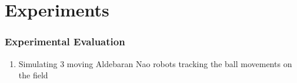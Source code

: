 \section{Experiments}

\begin{frame}
	\frametitle{Experimental Evaluation}
	
	\Large
	
	\vspace{0.3cm}
	
	\begin{enumerate}
		\item Simulating 3 moving Aldebaran Nao robots tracking the ball movements on the field
		
		\seti
	\end{enumerate}
	
	\begin{figure}
		\centering
		
	\end{figure}
\end{frame}

